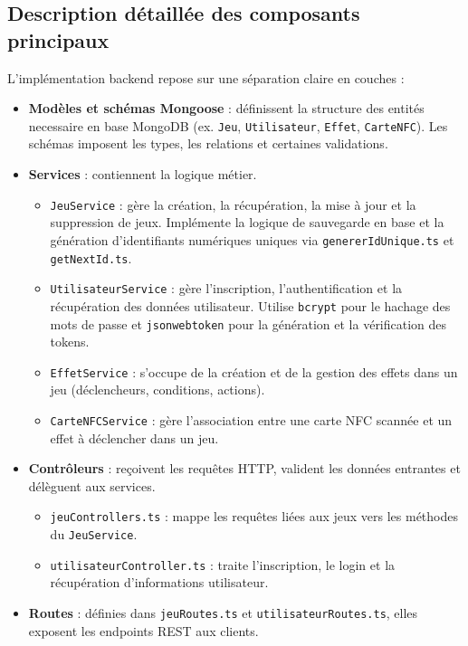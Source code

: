 \documentclass[12pt]{article}        %
\begin{document}
\subsection{Description détaillée des composants principaux}
\label{subsec:Description composants}
L’implémentation backend repose sur une séparation claire en couches : 
\begin{itemize}
    \item \textbf{Modèles et schémas Mongoose} : définissent la structure des entités necessaire en base MongoDB (ex. \texttt{Jeu}, \texttt{Utilisateur}, \texttt{Effet}, \texttt{CarteNFC}). 
    Les schémas imposent les types, les relations et certaines validations.
    \item \textbf{Services} : contiennent la logique métier.
    \begin{itemize}
        \item \texttt{JeuService} : gère la création, la récupération, la mise à jour et la suppression de jeux. Implémente la logique de sauvegarde en base et la génération d’identifiants numériques uniques via \texttt{genererIdUnique.ts} et \texttt{getNextId.ts}.
        \item \texttt{UtilisateurService} : gère l’inscription, l’authentification et la récupération des données utilisateur. Utilise \texttt{bcrypt} pour le hachage des mots de passe et \texttt{jsonwebtoken} pour la génération et la vérification des tokens.
        \item \texttt{EffetService} : s’occupe de la création et de la gestion des effets dans un jeu (déclencheurs, conditions, actions).
        \item \texttt{CarteNFCService} : gère l’association entre une carte NFC scannée et un effet à déclencher dans un jeu.
    \end{itemize}
    \item \textbf{Contrôleurs} : reçoivent les requêtes HTTP, valident les données entrantes et délèguent aux services.
    \begin{itemize}
        \item \texttt{jeuControllers.ts} : mappe les requêtes liées aux jeux vers les méthodes du \texttt{JeuService}.
        \item \texttt{utilisateurController.ts} : traite l’inscription, le login et la récupération d’informations utilisateur.
    \end{itemize}
    \item \textbf{Routes} : définies dans \texttt{jeuRoutes.ts} et \texttt{utilisateurRoutes.ts}, elles exposent les endpoints REST aux clients.

\end{itemize}
\end{document}
